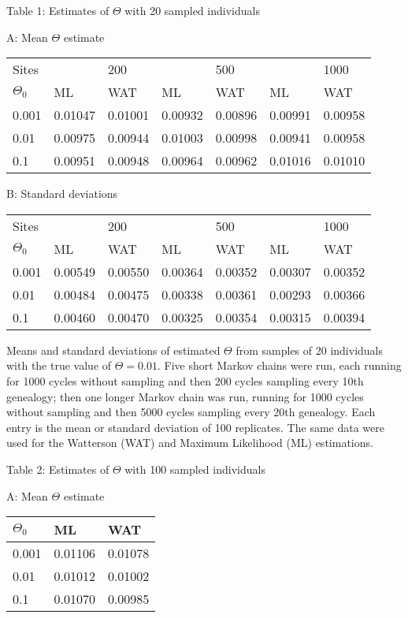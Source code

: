 \documentclass[12pt]{article}
\begin{document}
\newpage
\begin{flushleft}
Table 1:  Estimates of $\Theta$ with 20 sampled individuals
\bigskip

A:  Mean $\Theta$ estimate
\bigskip

\begin{tabular}{l | l l | l l | l l}
Sites & & 200 & & 500 & & 1000 \\
$\Theta_0$ & ML & WAT & ML & WAT & ML & WAT \\ 
\hline
0.001 & 0.01047 & 0.01001 & 0.00932 & 0.00896 & 0.00991 & 0.00958 \\
0.01 & 0.00975 & 0.00944 & 0.01003 & 0.00998 & 0.00941 & 0.00958 \\
0.1 & 0.00951 & 0.00948 & 0.00964 & 0.00962 & 0.01016 & 0.01010 \\
\end{tabular}

\bigskip
B:  Standard deviations
\bigskip

\begin{tabular}{l | l l | l l | l l}
Sites & & 200 & & 500 & & 1000 \\
$\Theta_0$ & ML & WAT & ML & WAT & ML & WAT \\ 
\hline
0.001 & 0.00549 & 0.00550 & 0.00364 & 0.00352 & 0.00307 & 0.00352 \\
0.01 & 0.00484 & 0.00475 & 0.00338 & 0.00361 & 0.00293 & 0.00366 \\
0.1 & 0.00460 & 0.00470 & 0.00325 & 0.00354 & 0.00315 & 0.00394 \\
\end{tabular}

\bigskip
Means and standard deviations of estimated $\Theta$ from samples 
of 20 individuals with the true value of $\Theta=0.01$.
Five short Markov chains were run, each running for 1000 cycles without
sampling and then 200 cycles sampling every 10th genealogy; then one
longer Markov chain was run, running for 1000 cycles without sampling
and then 5000 cycles sampling every 20th genealogy.
Each entry is the mean or standard deviation of 100 replicates.
The same data were used for the Watterson (WAT)
and Maximum Likelihood (ML) estimations.

\newpage

Table 2:  Estimates of $\Theta$ with 100 sampled individuals

\bigskip

A:  Mean $\Theta$ estimate
\bigskip

\begin{tabular}{l | l l }
$\Theta_0$ & ML & WAT  \\ 
\hline
0.001 & 0.01106 & 0.01078  \\
0.01 &  0.01012 & 0.01002 \\
0.1 &   0.01070 & 0.00985 \\
\end{tabular}
\bigskip


\end{flushleft}
\end{document}
